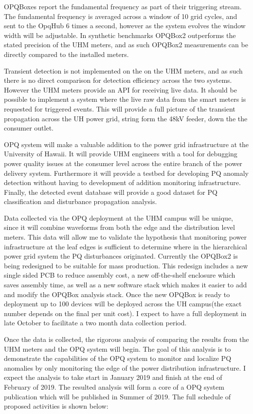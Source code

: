 OPQBoxes report the fundamental frequency as part of their triggering stream. The fundamental frequency is averaged across a window of 10 grid cycles, and sent to the OpqHub 6 times a second, however as the system evolves the window width will be adjustable. In synthetic benchmarks OPQBox2 outperforms the stated precision of the UHM meters, and as such OPQBox2 measurements can be directly compared to the installed meters.

Transient detection is not implemented on the on the UHM meters, and as such there is no direct comparison for detection efficiency across the two systems. However the UHM meters provide an API for receiving live data. It should be possible to implement a system where the live raw data from the smart meters is requested for triggered events. This will provide a full picture of the transient propagation across the UH power grid, string form the 48kV feeder, down the the consumer outlet.

OPQ system will make a valuable addition to the power grid infrastructure at the University of Hawaii. It will provide UHM engineers with a tool for debugging power quality issues at the consumer level across the entire branch of the power delivery system. Furthermore it will provide a testbed for developing PQ anomaly detection without having to development of addition monitoring infrastructure. Finally, the detected event database will provide a good dataset for PQ classification and disturbance propagation analysis.

Data collected via the OPQ deployment at the UHM campus will be unique, since it will combine waveforms from both the edge and the distribution level meters. This data will allow me to validate the hypothesis that monitoring power infrastructure at the leaf edges is sufficient to determine where in the hierarchical power grid system the PQ disturbances originated. Currently the OPQBox2 is being redesigned to be suitable for mass production. This redesign includes a new single sided PCB to reduce assembly cost, a new off-the-shelf enclosure which saves assembly time, as well as a new software stack which makes it easier to add and modify the OPQBox analysis stack. Once the new OPQBox is ready to deployment up to 100 devices will be deployed across the UH campus(the exact number depends on the final per unit cost). I expect to have a full deployment in late October to facilitate a two month data collection period. 

Once the data is collected, the rigorous analysis of comparing the results from the UHM meters and the OPQ system will begin. The goal of this analysis is to demonstrate the capabilities of the OPQ system to monitor and localize PQ anomalies by only monitoring the edge of the power distribution infrastructure. I expect the analysis to take start in January 2019 and finish at the end of February of 2019. The resulted analysis will form a core of a OPQ system publication which will be published in Summer of 2019. The full schedule of proposed activities is shown below:

